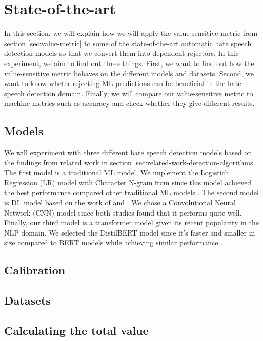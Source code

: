 \section{State-of-the-art}
\label{sec:state-of-the-art}
In this section, we will explain how we will apply the value-sensitive metric from section \ref{sec:value-metric} to some of the state-of-the-art automatic hate speech detection models so that we convert them into dependent rejectors.
%
In this experiment, we aim to find out three things.
%
First, we want to find out how the value-sensitive metric behaves on the different models and datasets.
%
Second, we want to know wheter rejecting ML predictions can be beneficial in the hate speech detection domain.
%
Finally, we will compare our value-sensitive metric to machine metrics such as accuracy and check whether they give different results.
%

\subsection{Models}
We will experiment with three different hate speech detection models based on the findings from related work in section \ref{sec:related-work-detection-algorithms}.
%
The first model is a traditional ML model.
%
We implement the Logistich Regression (LR) model with Character N-gram from \citet{waseem2016hateful} since this model achieved the best performance compared other traditional ML models \citet{davidson2017automated}.
%
The second model is DL model based on the work of \citet{agrawal2018deep} and \citet{badjatiya2017deep}.
%
We chose a Convolutional Neural Network (CNN) model since both studies found that it performs quite well.
%
Finally, our third model is a transformer model given its recent popularity in the NLP domain.
%
We selected the DistilBERT model since it's faster and smaller in size compared to BERT models while achieving similar performance \citep{sanh2019distilbert}.

\subsection{Calibration}

\subsection{Datasets}

\subsection{Calculating the total value}

